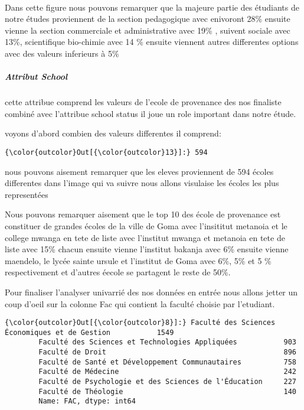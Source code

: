 \documentclass[11pt]{article}
\begin{document}
    \begin{center}
    \end{center}
    { \hspace*{\fill} \\}
    
    Dans cette figure nous pouvons remarquer que la majeure partie des
étudiants de notre études proviennent de la section pedagogique avec
enivoront 28\% ensuite vienne la section commerciale et administrative
avec 19\% , suivent sociale avec 13\%, scientifique bio-chimie avec 14
\% ensuite viennent autres differentes options avec des valeurs
inferieurs à 5\%

    \subparagraph{Attribut School}\label{attribut-school}

    cette attribue comprend les valeurs de l'ecole de provenance des nos
finaliste combiné avec l'attribue school status il joue un role
important dans notre étude.

    voyons d'abord combien des valeurs differentes il comprend:

            \begin{Verbatim}[commandchars=\\\{\}]
{\color{outcolor}Out[{\color{outcolor}13}]:} 594
\end{Verbatim}
        
    nous pouvons aisement remarquer que les eleves proviennent de 594 écoles
differentes dans l'image qui va suivre nous allons visulaise les écoles
les plus representées

    Nous pouvons remarquer aisement que le top 10 des école de provenance
est constituer de grandes écoles de la ville de Goma avec l'insititut
metanoia et le college mwanga en tete de liste avec l'institut mwanga et
metanoia en tete de liste avec 15\% chacun ensuite vienne l'institut
bakanja avec 6\% ensuite vienne maendelo, le lycée sainte ursule et
l'institut de Goma avec 6\%, 5\% et 5 \% respectivement et d'autres
éecole se partagent le reste de 50\%.

    Pour finaliser l'analyser univarrié des nos données en entrée nous
allons jetter un coup d'oeil sur la colonne Fac qui contient la faculté
choisie par l'etudiant.

            \begin{Verbatim}[commandchars=\\\{\}]
{\color{outcolor}Out[{\color{outcolor}8}]:} Faculté des Sciences Économiques et de Gestion           1549
        Faculté des Sciences et Technologies Appliquées           903
        Faculté de Droit                                          896
        Faculté de Santé et Développement Communautaires          758
        Faculté de Médecine                                       242
        Faculté de Psychologie et des Sciences de l'Éducation     227
        Faculté de Théologie                                      140
        Name: FAC, dtype: int64
\end{Verbatim}
        
\end{document}
